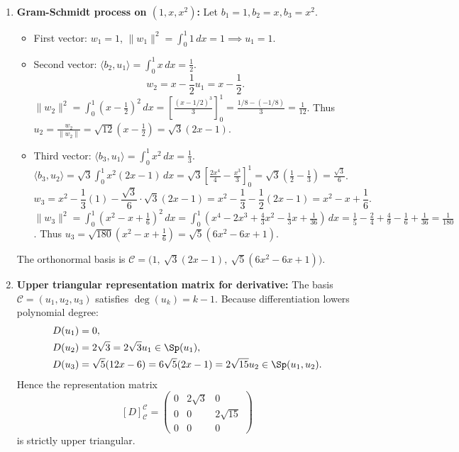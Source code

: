 \begin{exercisesolution*}
\label{sol:gram_schmidt_polynomials_derivative}
\begin{enumerate}[label=\textbf{(\alph*)}]
    \item \textbf{Gram-Schmidt process on $(1, x, x^2)$:}
    Let $b_1 = 1, b_2 = x, b_3 = x^2$.
    \begin{itemize}
        \item First vector: $w_1 = 1$, $\|w_1\|^2 = \int_0^1 1\,dx = 1 \implies u_1 = 1$.
        \item Second vector: $\langle b_2, u_1 \rangle = \int_0^1 x\,dx = \frac{1}{2}$.
        \[
        w_2 = x - \frac{1}{2} u_1 = x - \frac{1}{2}.
        \]
        $\|w_2\|^2 = \int_0^1 (x - \frac{1}{2})^2 \, dx = \left[ \frac{(x-1/2)^3}{3} \right]_0^1 = \frac{1/8 - (-1/8)}{3} = \frac{1}{12}$.
        Thus $u_2 = \frac{w_2}{\|w_2\|} = \sqrt{12}(x - \frac{1}{2}) = \sqrt{3}(2x - 1)$.
        \item Third vector:
        $\langle b_3, u_1 \rangle = \int_0^1 x^2\,dx = \frac{1}{3}$.
        $\langle b_3, u_2 \rangle = \sqrt{3} \int_0^1 x^2(2x - 1)\,dx = \sqrt{3} \left[ \frac{2x^4}{4} - \frac{x^3}{3} \right]_0^1 = \sqrt{3}(\frac{1}{2} - \frac{1}{3}) = \frac{\sqrt{3}}{6}$.
        \[
        w_3 = x^2 - \frac{1}{3}(1) - \frac{\sqrt{3}}{6} \cdot \sqrt{3}(2x - 1) = x^2 - \frac{1}{3} - \frac{1}{2}(2x - 1) = x^2 - x + \frac{1}{6}.
        \]
        $\|w_3\|^2 = \int_0^1 (x^2 - x + \frac{1}{6})^2 \, dx = \int_0^1 (x^4 - 2x^3 + \frac{4}{3}x^2 - \frac{1}{3}x + \frac{1}{36})\,dx = \frac{1}{5} - \frac{2}{4} + \frac{4}{9} - \frac{1}{6} + \frac{1}{36} = \frac{1}{180}$.
        Thus $u_3 = \sqrt{180}(x^2 - x + \frac{1}{6}) = \sqrt{5}(6x^2 - 6x + 1)$.
    \end{itemize}
    The orthonormal basis is $\mathcal{C} = \big(1, \ \sqrt{3}(2x-1), \ \sqrt{5}(6x^2 - 6x + 1)\big)$.

    \item \textbf{Upper triangular representation matrix for derivative:}
    The basis $\mathcal{C} = (u_1, u_2, u_3)$ satisfies $\deg(u_k) = k - 1$.
    Because differentiation lowers polynomial degree:
    \begin{align*}
    D(u_1) &= 0, \\
    D(u_2) &= 2\sqrt{3} = 2\sqrt{3} u_1 \in \Sp(u_1), \\
    D(u_3) &= \sqrt{5}(12x - 6) = 6\sqrt{5}(2x - 1) = 2\sqrt{15} u_2 \in \Sp(u_1, u_2).
    \end{align*}
    Hence the representation matrix
    \[
    [D]_\mathcal{C}^\mathcal{C} = \begin{pmatrix} 0 & 2\sqrt{3} & 0 \\ 0 & 0 & 2\sqrt{15} \\ 0 & 0 & 0 \end{pmatrix}
    \]
    is strictly upper triangular. \qedhere
\end{enumerate}
\end{exercisesolution*}
